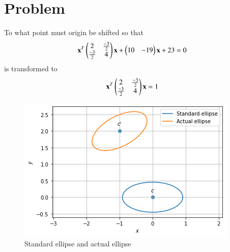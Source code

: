 \documentclass[journal,12pt,twocolumn]{IEEEtran}
\begin{document}
\section{Problem}
%
To what point must origin be shifted so that
\begin{align}\label{eq12}
\mathbf{x}^T\begin{pmatrix}2 & \frac{-3}{2}\\\frac{-3}{2}& 4\end{pmatrix}\mathbf{x}+\begin{pmatrix} 10& -19\end{pmatrix}\mathbf{x}+23=0
\end{align}
is transformed to 
\begin{align}\label{eq11}
\mathbf{x}^T\begin{pmatrix}2 & \frac{-3}{2}\\\frac{-3}{2}& 4\end{pmatrix}\mathbf{x}=1
\end{align}
\renewcommand{\thefigure}{1}
\begin{figure}[h]
    \centering
    \includegraphics[width=\columnwidth]{Assignment 6.png}
    \caption{Standard ellipse and actual ellipse}
    \label{Fig :1}
\end{figure}
\end{document}
